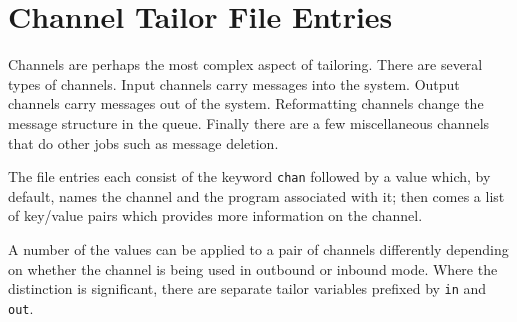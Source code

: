 
\section{Channel Tailor File Entries}

Channels are perhaps the most complex aspect of tailoring. There are
several types of channels. Input channels carry messages into the
system. Output channels carry messages out of the system. Reformatting
channels change the message structure in the queue. Finally there are
a few miscellaneous channels that do other jobs such as message deletion.

The  file entries each consist of the keyword
\verb+chan+ followed by a value which, by default, names the channel
and the program associated with it; then comes a list of key/value
pairs which provides more information on the channel.

A number of the values can be applied to a pair of channels
differently depending on whether the channel is being used in outbound
or inbound mode. Where the distinction is significant, there are
separate tailor variables prefixed by \verb|in| and \verb|out|.

